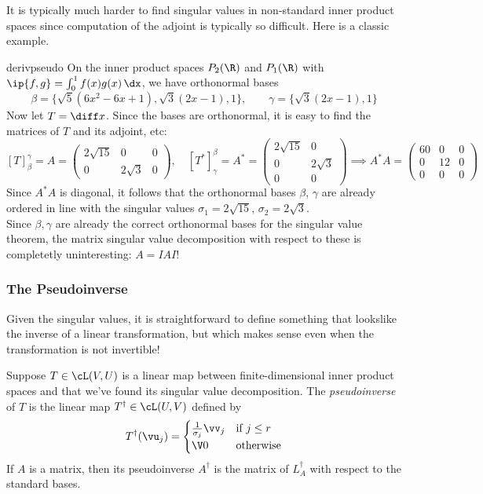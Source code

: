 It is typically much harder to find singular values in non-standard inner product spaces since computation of the adjoint is typically so difficult. Here is a classic example.

\begin{example}{}{derivpseudo}
On the inner product spaces $P_2(\R)$ and $P_1(\R)$ with  $\ip{f,g}=\int_0^1f(x)g(x)\,\dx$, we have orthonormal bases
\[\beta=\{\sqrt 5(6x^2-6x+1),\sqrt 3(2x-1),1\},\qquad \gamma=\{\sqrt 3(2x-1),1\}\]
Now let $T=\diff x$. Since the bases are orthonormal, it is easy to find the matrices of $T$ and its adjoint, etc:
\[[T]_\beta^\gamma=A=\begin{pmatrix}
2\sqrt{15}&0&0\\
0&2\sqrt 3&0
\end{pmatrix},\quad
[T^*]_\gamma^\beta=A^*=\begin{pmatrix}
2\sqrt{15}&0\\
0&2\sqrt 3\\
0&0
\end{pmatrix}
\implies A^*A=\begin{pmatrix}
60&0&0\\
0&12&0\\
0&0&0
\end{pmatrix}\]
Since $A^*A$ is diagonal, it follows that the orthonormal bases $\beta$, $\gamma$ are already ordered in line with the singular values $\sigma_1=2\sqrt{15}$, $\sigma_2=2\sqrt 3$.\\[5pt]
Since $\beta,\gamma$ are already the correct orthonormal bases for the singular value theorem, the matrix singular value decomposition with respect to these is completetly uninteresting: $A=IAI$!
\end{example}

\subsubsection*{The Pseudoinverse}

Given the singular values, it is straightforward to define something that lookslike the inverse of a linear transformation, but which makes sense even when the transformation is not invertible!

\begin{defn}{}{}
Suppose $T\in\cL(V,U)$ is a linear map between finite-dimensional inner product spaces and that we've found its singular value decomposition. The \emph{pseudoinverse} of $T$ is the linear map $T^\dag\in\cL(U,V)$ defined by
  \[T^\dag(\vu_j)=\begin{cases}
  \frac 1{\sigma_j}\vv_j&\text{if }j\le r\\
  \V0&\text{otherwise}
  \end{cases}\]
  If $A$ is a matrix, then its pseudoinverse $A^\dag$ is the matrix of $L_A^\dag$ with respect to the standard bases.
\end{defn}

